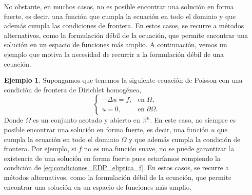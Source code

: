 \documentclass[a4paper,11pt,spanish, twoside, leqno]{tfg-uam}
\theoremstyle{definition}
\newtheorem{exmp}[teor]{Ejemplo}
\begin{document}
No obstante, en muchos casos, no es posible encontrar una solución en forma fuerte, es decir, una función que cumpla la ecuación en todo el dominio y que además cumpla las condiciones de frontera. En estos casos, se recurre a métodos alternativos, como la formulación débil de la ecuación, que permite encontrar una solución en un espacio de funciones más amplio. A continuación, vemos un ejemplo que motiva la necesidad de recurrir a la formulación débil de una ecuación.

\begin{exmp}
    Supongamos que tenemos la siguiente ecuación de Poisson con una condición de frontera de Dirichlet homogénea,
    \begin{equation*}
        \begin{cases}
            -\Delta u = f, & \text{en } \Omega,
            \\
            u = 0, & \text{en } \partial\Omega.
        \end{cases}
    \end{equation*}
    Donde $\Omega$ es un conjunto acotado y abierto en $\mathbb{R}^n$. En este caso, no siempre es posible encontrar una solución en forma fuerte, es decir, una función $u$ que cumpla la ecuación en todo el dominio $\Omega$ y que además cumpla la condición de frontera. Por ejemplo, si $f$ no es una función suave, no se puede garantizar la existencia de una solución en forma fuerte pues estaríamos rompiendo la condición de \eqref{eq:condiciones_EDP_eliptica_f}. En estos casos, se recurre a métodos alternativos, como la formulación débil de la ecuación, que permite encontrar una solución en un espacio de funciones más amplio. 
\end{exmp}
\end{document}

